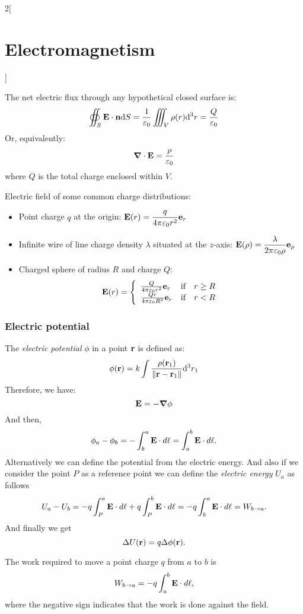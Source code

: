 \documentclass[../../../main.tex]{subfiles}
\begin{document}
\begin{multicols}{2}[\section{Electromagnetism}]
\begin{theorem}
    The net electric flux through any hypothetical closed surface is:
    $$
      \oiint_S\boldsymbol{\mathrm{E}}\cdot\boldsymbol{\mathrm{n}}\dd S=\frac{1}{\varepsilon_0}\iiint_V\rho(r)\dd^3 r=\frac{Q}{\varepsilon_0}
    $$
    Or, equivalently:
    \begin{equation}
      \boldsymbol{\mathrm{\nabla}}\cdot\boldsymbol{\mathrm{E}}=\frac{\rho}{\varepsilon_0}
      \label{E_gauss}
    \end{equation}
    where $Q$ is the total charge enclosed within $V$.
  \end{theorem}
  \begin{prop}
    Electric field of some common charge distributions:
    \begin{itemize}
      \item Point charge $q$ at the origin: $\displaystyle \boldsymbol{\mathrm{E}}(r)=\frac{q}{4\pi\varepsilon_0 r^2}\boldsymbol{\mathrm{e}}_r$
      \item Infinite wire of line charge density $\lambda$ situated at the $z$-axis:  $\displaystyle \boldsymbol{\mathrm{E}}(\rho)=\frac{\lambda}{2\pi\varepsilon_0 \rho}\boldsymbol{\mathrm{e}}_\rho$
      \item Charged sphere of radius $R$ and charge $Q$:
            $$\boldsymbol{\mathrm{E}}(r)=\left\{
              \begin{array}{lcc}
                \frac{Q}{4\pi\varepsilon_0r^2}\boldsymbol{\mathrm{e}}_r  & \text{if} & r\geq R \\
                \frac{Qr}{4\pi\varepsilon_0R^3}\boldsymbol{\mathrm{e}}_r & \text{if} & r<R
              \end{array}
              \right.$$
    \end{itemize}
  \end{prop}
  \subsubsection{Electric potential}
  \begin{definition}
    The \emph{electric potential} $\phi$ in a point $\boldsymbol{\mathrm{r}}$ is defined as:
    \begin{equation}
      \phi(\boldsymbol{\mathrm{r}})=k\int\frac{\rho(\boldsymbol{\mathrm{r}}_1)}{\|\boldsymbol{\mathrm{r}}-\boldsymbol{\mathrm{r}}_1\|}\dd^3 r_1
    \end{equation}
    Therefore, we have:
    \begin{equation}
      \boldsymbol{\mathrm{E}}=-\grad\phi
      \label{E_potential}
    \end{equation}
    And then, $$\phi_a-\phi_b=-\int_b^a\boldsymbol{\mathrm{E}}\cdot d\ell=\int_a^b\boldsymbol{\mathrm{E}}\cdot d\ell.$$ Alternatively we can define the potential from the electric energy.  And also if we consider the point $P$ as a reference point we can define the \emph{electric energy} $U_a$ as follows $$U_a-U_b=-q\int_P^a\boldsymbol{\mathrm{E}}\cdot d\ell+q\int_P^b\boldsymbol{\mathrm{E}}\cdot d\ell=-q\int_b^a\boldsymbol{\mathrm{E}}\cdot d\ell=W_{b\to a}.$$ And finally we get $$\Delta U(\boldsymbol{\mathrm{r}})=q\Delta\phi(\boldsymbol{\mathrm{r}}).$$
  \end{definition}
  \begin{prop}[Work]
    The work required to move a point charge $q$ from $a$ to $b$ is $$W_{b\to a}=-q\int_a^b\boldsymbol{\mathrm{E}}\cdot d\ell,$$ where the negative sign indicates that the work is done against the field.
  \end{prop}


\end{multicols}
\end{document}
